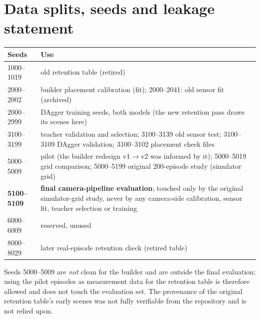 \documentclass[11pt,a4paper]{article}
\begin{document}
\section{Data splits, seeds and leakage statement}
\begin{center}\small\begin{tabular}{@{}p{3.1cm}p{12.2cm}@{}}\toprule
Seeds & Use\\\midrule
1000--1019 & old retention table (retired)\\
2000--2002 & builder placement calibration (fit); 2000--2041: old sensor fit (archived)\\
2000--2999 & DAgger training seeds, both models (the new retention pass draws its scenes here)\\
3100--3199 & teacher validation and selection; 3100--3139 old sensor test; 3100--3109 DAgger validation; 3100--3102 placement check files\\
5000--5009 & pilot (the builder redesign v1$\to$v2 was informed by it); 5000--5019 grid comparison; 5000--5199 original 200-episode study (simulator grid)\\
\textbf{5100--5109} & \textbf{final camera-pipeline evaluation}; touched only by the original simulator-grid study, never by any camera-side calibration, sensor fit, teacher selection or training\\
6000--6009 & reserved, unused\\
8000--8029 & later real-episode retention check (retired table)\\\bottomrule\end{tabular}\end{center}
Seeds 5000--5009 are \emph{not} clean for the builder and are outside the final evaluation; using the pilot episodes as measurement data for the retention table is therefore allowed and does not touch the evaluation set. The provenance of the original retention table's early scenes was not fully verifiable from the repository and is not relied upon.
\end{document}
